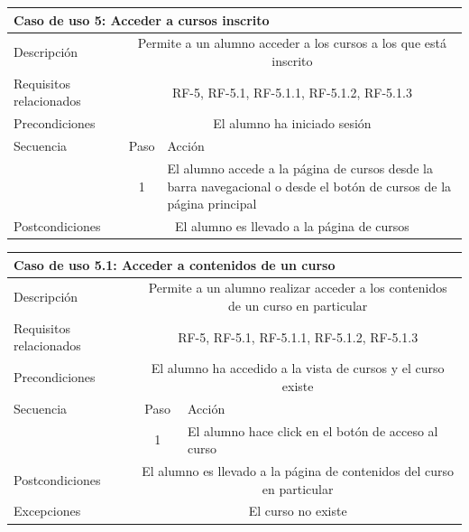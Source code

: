 \hspace{3cm} 


\begin{adjustwidth}{-2cm}{}
\begin{tabular}[H]{l c l}
\toprule 
\multicolumn{3}{l}{\textbf{Caso de uso 5: Acceder a cursos inscrito}}\\
\midrule
Descripción & \multicolumn{2}{p{10cm}}{Permite a un alumno acceder a los cursos a los que está inscrito}\\
\midrule
Requisitos relacionados & \multicolumn{2}{p{10cm}}{RF-5, RF-5.1, RF-5.1.1, RF-5.1.2, RF-5.1.3}\\
\midrule
Precondiciones & \multicolumn{2}{p{10cm}}{El alumno ha iniciado sesión}\\
\midrule
Secuencia & Paso & Acción \\
\cmidrule{2-3}
         & 1 & \multicolumn{1}{p{8cm}}{El alumno accede a la página de cursos desde la barra navegacional o desde el botón de cursos de la página principal} \\
\midrule
Postcondiciones & \multicolumn{2}{p{10cm}}{El alumno es llevado a la página de cursos}\\
\bottomrule 
\end{tabular}


\hspace{3cm} 

\begin{tabular}[H]{l c l}
\toprule 
\multicolumn{3}{l}{\textbf{Caso de uso 5.1: Acceder a contenidos de un curso}}\\
\midrule
Descripción & \multicolumn{2}{p{10cm}}{Permite a un alumno realizar acceder a los contenidos de un curso en particular}\\
\midrule
Requisitos relacionados & \multicolumn{2}{p{10cm}}{RF-5, RF-5.1, RF-5.1.1,  RF-5.1.2, RF-5.1.3}\\
\midrule
Precondiciones & \multicolumn{2}{p{10cm}}{El alumno ha accedido a la vista de cursos y el curso existe}\\
\midrule
Secuencia & Paso & Acción \\
\cmidrule{2-3}
         & 1 &  \multicolumn{1}{p{8cm}}{El alumno hace click en el botón de acceso al curso}\\

\midrule
Postcondiciones & \multicolumn{2}{p{10cm}}{El alumno es llevado a la página de contenidos del curso en particular}\\
\midrule
Excepciones & \multicolumn{2}{p{10cm}}{El curso no existe}\\
\bottomrule 
\end{tabular}
\end{adjustwidth}

